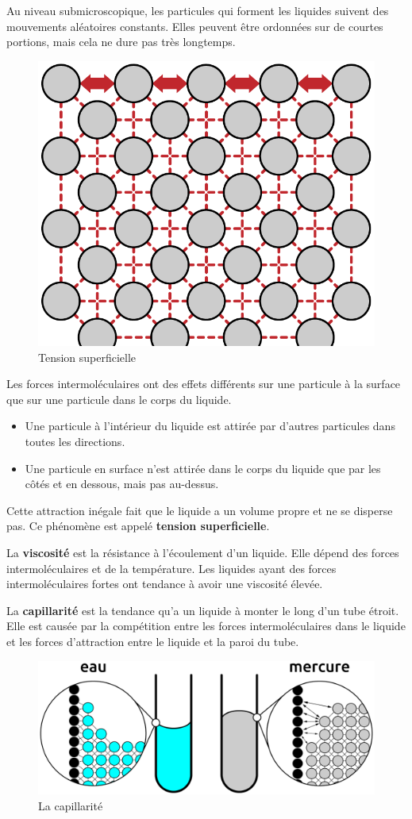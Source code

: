 \documentclass[
  11pt,
  french,
  a4paper,
  openany]{book}
\providecommand{\tightlist}{%
  \setlength{\itemsep}{0pt}\setlength{\parskip}{0pt}}
\begin{document}
Au niveau submicroscopique, les particules qui forment les liquides suivent des mouvements aléatoires constants. Elles peuvent être ordonnées sur de courtes portions, mais cela ne dure pas très longtemps.

\begin{figure}

{\centering \includegraphics[width=0.33\linewidth]{images/tension-surface} 

}

\caption{Tension superficielle}\label{fig:tension-surface}
\end{figure}

Les forces intermoléculaires ont des effets différents sur une particule à la surface que sur une particule dans le corps du liquide.

\begin{itemize}
\tightlist
\item
  Une particule à l'intérieur du liquide est attirée par d'autres particules dans toutes les directions.
\item
  Une particule en surface n'est attirée dans le corps du liquide que par les côtés et en dessous, mais pas au-dessus.
\end{itemize}

Cette attraction inégale fait que le liquide a un volume propre et ne se disperse pas. Ce phénomène est appelé \textbf{tension superficielle}.

La \textbf{viscosité} est la résistance à l'écoulement d'un liquide. Elle dépend des forces intermoléculaires et de la température. Les liquides ayant des forces intermoléculaires fortes ont tendance à avoir une viscosité élevée.

La \textbf{capillarité} est la tendance qu'a un liquide à monter le long d'un tube étroit. Elle est causée par la compétition entre les forces intermoléculaires dans le liquide et les forces d'attraction entre le liquide et la paroi du tube.

\begin{figure}

{\centering \includegraphics[width=0.67\linewidth]{images/capillarity} 

}

\caption{La capillarité}\label{fig:capillarity}
\end{figure}
\end{document}

